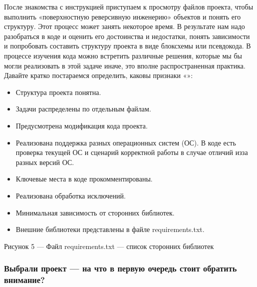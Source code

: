 \documentclass[letterpaper,10pt,russian]{sphinxmanual}
\begin{document}
\sphinxAtStartPar
После знакомства с инструкцией приступаем к просмотру файлов проекта, чтобы выполнить «поверхностную реверсивную инженерию» объектов и понять его структуру. Этот процесс может занять некоторое время. В результате нам надо разобраться в коде и оценить его достоинства и недостатки, понять зависимости и попробовать составить структуру проекта в виде блок\sphinxhyphen{}схемы или псевдокода. В процессе изучения кода можно встретить различные решения, которые мы бы могли реализовать в этой задаче иначе, это вполне распространенная практика. Давайте кратко постараемся определить, каковы признаки «»:
\begin{itemize}
\item {} 
\sphinxAtStartPar
Структура проекта понятна.

\item {} 
\sphinxAtStartPar
Задачи распределены по отдельным файлам.

\item {} 
\sphinxAtStartPar
Предусмотрена модификация кода проекта.

\item {} 
\sphinxAtStartPar
Реализована поддержка разных операционных систем (ОС). В коде есть проверка текущей ОС и сценарий корректной работы в случае отличий из\sphinxhyphen{}за разных версий ОС.

\item {} 
\sphinxAtStartPar
Ключевые места в коде прокомментированы.

\item {} 
\sphinxAtStartPar
Реализована обработка исключений.

\item {} 
\sphinxAtStartPar
Минимальная зависимость от сторонних библиотек.

\item {} 
\sphinxAtStartPar
Внешние библиотеки представлены в файле requirements.txt.

\end{itemize}

\sphinxAtStartPar
{}

\sphinxAtStartPar
Рисунок 5 — Файл requirements.txt — список сторонних библиотек


\subsubsection{Выбрали проект — на что в первую очередь стоит обратить внимание?}
\label{\detokenize{educational_materials/github/content:id3}}
\sphinxAtStartPar
{}
\end{document}
